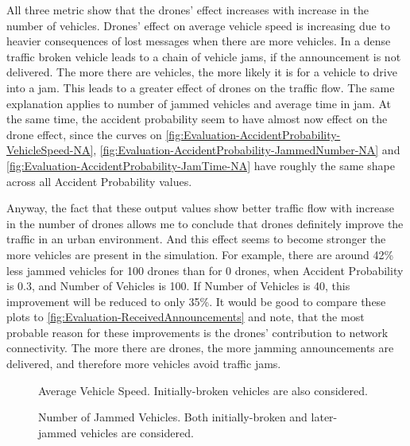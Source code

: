 \documentclass[]{nsm-thesis}
\begin{document}
All three metric show that the drones' effect increases with increase in the number of vehicles. Drones' effect on average vehicle speed is increasing due to heavier consequences of lost messages when there are more vehicles. In a dense traffic broken vehicle leads to a chain of vehicle jams, if the announcement is not delivered. The more there are vehicles, the more likely it is for a vehicle to drive into a jam. This leads to a greater effect of drones on the traffic flow. The same explanation applies to number of jammed vehicles and average time in jam. At the same time, the accident probability seem to have almost now effect on the drone effect, since the curves on \cref{fig:Evaluation-AccidentProbability-VehicleSpeed-NA}, \cref{fig:Evaluation-AccidentProbability-JammedNumber-NA} and \cref{fig:Evaluation-AccidentProbability-JamTime-NA} have roughly the same shape across all Accident Probability values.

Anyway, the fact that these output values show better traffic flow with increase in the number of drones allows me to conclude that drones definitely improve the traffic in an urban environment. And this effect seems to become stronger the more vehicles are present in the simulation. For example, there are around 42\% less jammed vehicles for 100 drones than for 0 drones, when Accident Probability is 0.3, and Number of Vehicles is 100. If Number of Vehicles is 40, this improvement will be reduced to only 35\%. It would be good to compare these plots to \cref{fig:Evaluation-ReceivedAnnouncements} and note, that the most probable reason for these improvements is the drones' contribution to network connectivity. The more there are drones, the more jamming announcements are delivered, and therefore more vehicles avoid traffic jams.

\begin{figure}%
	\centering
	\hfill
	\hfill
	\caption{Average Vehicle Speed. Initially-broken vehicles are also considered.}%
	\label{fig:Evaluation-VehicleSpeed}%
\end{figure}

\begin{figure}%
	\centering
	\hfill
	\hfill
	\caption{Number of Jammed Vehicles. Both initially-broken and later-jammed vehicles are considered.}%
	\label{fig:Evaluation-JammedNumber}%
\end{figure}
\end{document}
